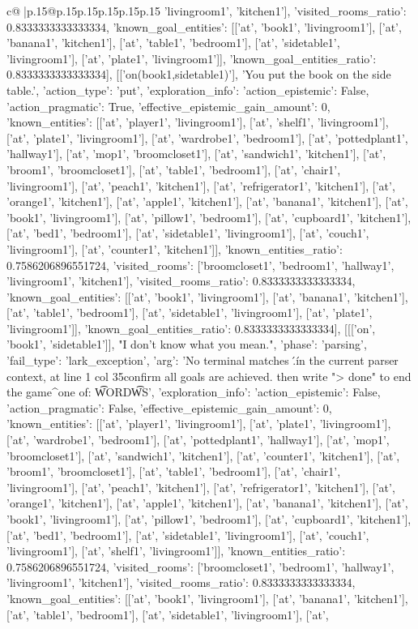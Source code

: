 \documentclass{article}
\begin{document}
{\begin{supertabular}{c@{$\;$}|p{.15\linewidth}@{}p{.15\linewidth}p{.15\linewidth}p{.15\linewidth}p{.15\linewidth}p{.15\linewidth}}
{{{'livingroom1', 'kitchen1'], 'visited_rooms_ratio': 0.8333333333333334, 'known_goal_entities': [['at', 'book1', 'livingroom1'], ['at', 'banana1', 'kitchen1'], ['at', 'table1', 'bedroom1'], ['at', 'sidetable1', 'livingroom1'], ['at', 'plate1', 'livingroom1']], 'known_goal_entities_ratio': 0.8333333333333334}}], [['on(book1,sidetable1)'], 'You put the book on the side table.\n', {'action_type': 'put', 'exploration_info': {'action_epistemic': False, 'action_pragmatic': True, 'effective_epistemic_gain_amount': 0, 'known_entities': [['at', 'player1', 'livingroom1'], ['at', 'shelf1', 'livingroom1'], ['at', 'plate1', 'livingroom1'], ['at', 'wardrobe1', 'bedroom1'], ['at', 'pottedplant1', 'hallway1'], ['at', 'mop1', 'broomcloset1'], ['at', 'sandwich1', 'kitchen1'], ['at', 'broom1', 'broomcloset1'], ['at', 'table1', 'bedroom1'], ['at', 'chair1', 'livingroom1'], ['at', 'peach1', 'kitchen1'], ['at', 'refrigerator1', 'kitchen1'], ['at', 'orange1', 'kitchen1'], ['at', 'apple1', 'kitchen1'], ['at', 'banana1', 'kitchen1'], ['at', 'book1', 'livingroom1'], ['at', 'pillow1', 'bedroom1'], ['at', 'cupboard1', 'kitchen1'], ['at', 'bed1', 'bedroom1'], ['at', 'sidetable1', 'livingroom1'], ['at', 'couch1', 'livingroom1'], ['at', 'counter1', 'kitchen1']], 'known_entities_ratio': 0.7586206896551724, 'visited_rooms': ['broomcloset1', 'bedroom1', 'hallway1', 'livingroom1', 'kitchen1'], 'visited_rooms_ratio': 0.8333333333333334, 'known_goal_entities': [['at', 'book1', 'livingroom1'], ['at', 'banana1', 'kitchen1'], ['at', 'table1', 'bedroom1'], ['at', 'sidetable1', 'livingroom1'], ['at', 'plate1', 'livingroom1']], 'known_goal_entities_ratio': 0.8333333333333334}}], [[['on', 'book1', 'sidetable1']], "I don't know what you mean.\n", {'phase': 'parsing', 'fail_type': 'lark_exception', 'arg': 'No terminal matches \'.\' in the current parser context, at line 1 col 35\n\nand confirm all goals are achieved. then write "> done" to end the game\n                                  ^\nExpected one of: \n\t* WORD\n\t* WS\n', 'exploration_info': {'action_epistemic': False, 'action_pragmatic': False, 'effective_epistemic_gain_amount': 0, 'known_entities': [['at', 'player1', 'livingroom1'], ['at', 'plate1', 'livingroom1'], ['at', 'wardrobe1', 'bedroom1'], ['at', 'pottedplant1', 'hallway1'], ['at', 'mop1', 'broomcloset1'], ['at', 'sandwich1', 'kitchen1'], ['at', 'counter1', 'kitchen1'], ['at', 'broom1', 'broomcloset1'], ['at', 'table1', 'bedroom1'], ['at', 'chair1', 'livingroom1'], ['at', 'peach1', 'kitchen1'], ['at', 'refrigerator1', 'kitchen1'], ['at', 'orange1', 'kitchen1'], ['at', 'apple1', 'kitchen1'], ['at', 'banana1', 'kitchen1'], ['at', 'book1', 'livingroom1'], ['at', 'pillow1', 'bedroom1'], ['at', 'cupboard1', 'kitchen1'], ['at', 'bed1', 'bedroom1'], ['at', 'sidetable1', 'livingroom1'], ['at', 'couch1', 'livingroom1'], ['at', 'shelf1', 'livingroom1']], 'known_entities_ratio': 0.7586206896551724, 'visited_rooms': ['broomcloset1', 'bedroom1', 'hallway1', 'livingroom1', 'kitchen1'], 'visited_rooms_ratio': 0.8333333333333334, 'known_goal_entities': [['at', 'book1', 'livingroom1'], ['at', 'banana1', 'kitchen1'], ['at', 'table1', 'bedroom1'], ['at', 'sidetable1', 'livingroom1'], ['at', }}}
\end{supertabular}}
\end{document}
